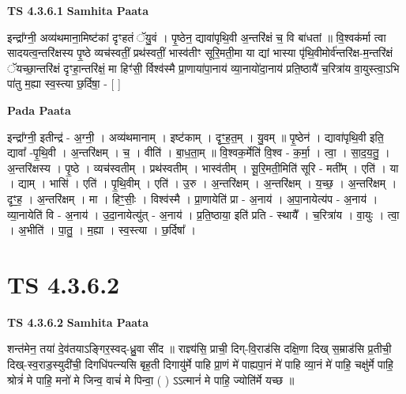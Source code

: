 \documentclass[17pt]{extarticle}
\begin{document}
\textbf{TS 4.3.6.1 } \newline
\textbf{Samhita Paata} \newline

इन्द्रा᳚ग्नी॒ अव्य॑थमाना॒मिष्ट॑कां दृꣳहतं ॅयु॒वं । पृ॒ष्ठेन॒ द्यावा॑पृथि॒वी अ॒न्तरि॑क्षं च॒ वि बा॑धतां ॥ वि॒श्वक॑र्मा त्वा सादयत्व॒न्तरि॑क्षस्य पृ॒ष्ठे व्यच॑स्वतीं॒ प्रथ॑स्वतीं॒ भास्व॑तीꣳ सूरि॒मती॒मा या द्यां भास्या पृ॑थि॒वीमोर्व॑न्तरि॑क्ष-म॒न्तरि॑क्षं ॅयच्छा॒न्तरि॑क्षं दृꣳहा॒न्तरि॑क्षं॒ मा हिꣳ॑सी॒ र्विश्व॑स्मै प्रा॒णाया॑पा॒नाय॑ व्या॒नायो॑दा॒नाय॑ प्रति॒ष्ठायै॑ च॒रित्रा॑य वा॒युस्त्वा॒ऽभि पा॑तु म॒ह्या स्व॒स्त्या छ॒र्दिषा॒ - [  ] \newline

\textbf{Pada Paata} \newline

इन्द्रा᳚ग्नी॒ इतीन्द्र॑ - अ॒ग्नी॒ । अव्य॑थमानाम् । इष्ट॑काम् । दृꣳ॒॒ह॒त॒म् । यु॒वम् ॥ पृ॒ष्ठेन॑ । द्यावा॑पृथि॒वी इति॒ द्यावा᳚ -पृ॒थि॒वी । अ॒न्तरि॑क्षम् । च॒ । वीति॑ । बा॒ध॒ता॒म् ॥ वि॒श्वक॒र्मेति॑ वि॒श्व - क॒र्मा॒ । त्वा॒ । सा॒द॒य॒तु॒ । अ॒न्तरि॑क्षस्य । पृ॒ष्ठे । व्यच॑स्वतीम् । प्रथ॑स्वतीम् । भास्व॑तीम् । सू॒रि॒मती॒मिति॑ सूरि - मती᳚म् । एति॑ । या । द्याम् । भासि॑ । एति॑ । पृ॒थि॒वीम् । एति॑ । उ॒रु । अ॒न्तरि॑क्षम् । अ॒न्तरि॑क्षम् । य॒च्छ॒ । अ॒न्तरि॑क्षम् । दृꣳ॒॒ह॒ । अ॒न्तरि॑क्षम् । मा । हिꣳ॒॒सीः॒ । विश्व॑स्मै । प्रा॒णायेति॑ प्रा - अ॒नाय॑ । अ॒पा॒नायेत्य॑प - अ॒नाय॑ । व्या॒नायेति॑ वि - अ॒नाय॑ । उ॒दा॒नायेत्यु॑त् - अ॒नाय॑ । प्र॒ति॒ष्ठाया॒ इति॑ प्रति - स्थायै᳚ । च॒रित्रा॑य । वा॒युः । त्वा॒ । अ॒भीति॑ । पा॒तु॒ । म॒ह्या । स्व॒स्त्या । छ॒र्दिषा᳚ ।  \newline




\section*{ TS 4.3.6.2 }

\textbf{TS 4.3.6.2 } \newline
\textbf{Samhita Paata} \newline

शन्त॑मेन॒ तया॑ दे॒व॑तयाऽङ्गिर॒स्वद्-ध्रु॒वा सी॑द ॥ राज्ञ्य॑सि॒ प्राची॒ दिग्-वि॒राड॑सि दक्षि॒णा दिख् स॒म्राड॑सि प्र॒तीची॒ दिख्-स्व॒राड॒स्युदी॑ची॒ दिगधि॑पत्न्यसि बृह॒ती दिगायु॑र्मे पाहि प्रा॒णं मे॑ पाह्यपा॒नं मे॑ पाहि व्या॒नं मे॑ पाहि॒ चक्षु॑र्मे पाहि॒ श्रोत्रं॑ मे पाहि॒ मनो॑ मे जिन्व॒ वाचं॑ मे पिन्वा॒ ( ) ऽऽत्मानं॑ मे पाहि॒ ज्योति॑र्मे यच्छ ॥ \newline
\end{document}
